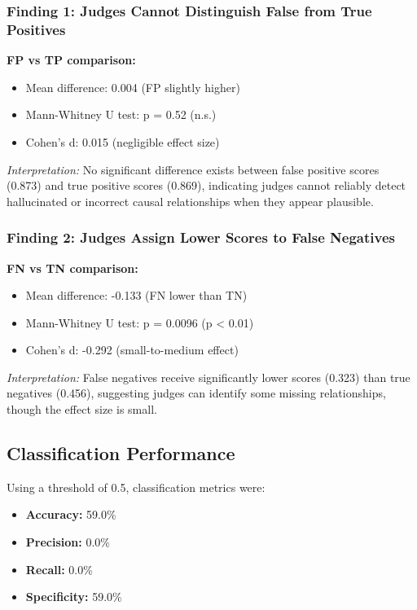 \subsubsection{Finding 1: Judges Cannot Distinguish False from True Positives}

\textbf{FP vs TP comparison:}
\begin{itemize}
    \item Mean difference: 0.004 (FP slightly higher)
    \item Mann-Whitney U test: p = 0.52 (n.s.)
    \item Cohen's d: 0.015 (negligible effect size)
\end{itemize}

\textit{Interpretation:} No significant difference exists between false positive scores (0.873) and true positive scores (0.869), indicating judges cannot reliably detect hallucinated or incorrect causal relationships when they appear plausible.

\subsubsection{Finding 2: Judges Assign Lower Scores to False Negatives}

\textbf{FN vs TN comparison:}
\begin{itemize}
    \item Mean difference: -0.133 (FN lower than TN)
    \item Mann-Whitney U test: p = 0.0096 (p < 0.01)
    \item Cohen's d: -0.292 (small-to-medium effect)
\end{itemize}

\textit{Interpretation:} False negatives receive significantly lower scores (0.323) than true negatives (0.456), suggesting judges can identify some missing relationships, though the effect size is small.

\subsection{Classification Performance}

Using a threshold of 0.5, classification metrics were:

\begin{itemize}
    \item \textbf{Accuracy:} 59.0\%
    \item \textbf{Precision:} 0.0\%
    \item \textbf{Recall:} 0.0\%
    \item \textbf{Specificity:} 59.0\%
\end{itemize}

